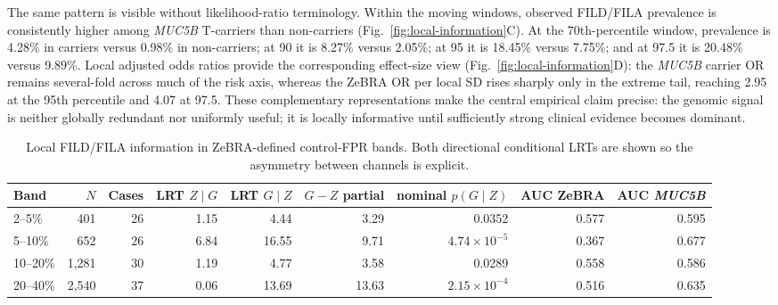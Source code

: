 {The same pattern is visible without likelihood-ratio terminology. Within the moving windows, observed FILD/FILA prevalence is consistently higher among \textit{MUC5B} T-carriers than non-carriers (Fig.~\ref{fig:local-information}C). At the 70th-percentile window, prevalence is 4.28\% in carriers versus 0.98\% in non-carriers; at 90 it is 8.27\% versus 2.05\%; at 95 it is 18.45\% versus 7.75\%; and at 97.5 it is 20.48\% versus 9.89\%. Local adjusted odds ratios provide the corresponding effect-size view (Fig.~\ref{fig:local-information}D): the \textit{MUC5B} carrier OR remains several-fold across much of the risk axis, whereas the ZeBRA OR per local SD rises sharply only in the extreme tail, reaching 2.95 at the 95th percentile and 4.07 at 97.5. These complementary representations make the central empirical claim precise: the genomic signal is neither globally redundant nor uniformly useful; it is locally informative until sufficiently strong clinical evidence becomes dominant.

\figLocalInformation

\begin{table}[!t]
\caption{Local FILD/FILA information in ZeBRA-defined control-FPR bands. Both directional conditional LRTs are shown so the asymmetry between channels is explicit.}
\label{tab:local-info}\centering\scriptsize
\begin{tabular}{lrrrrrrrr}
\toprule
Band & $N$ & Cases & LRT $Z\mid G$ & LRT $G\mid Z$ & $G{-}Z$ partial & nominal $p(G\mid Z)$ & AUC ZeBRA & AUC \textit{MUC5B}\\
\midrule
2--5\% & 401 & 26 & 1.15 & 4.44 & 3.29 & 0.0352 & 0.577 & 0.595\\
5--10\% & 652 & 26 & 6.84 & 16.55 & 9.71 & $4.74\times10^{-5}$ & 0.367 & 0.677\\
10--20\% & 1,281 & 30 & 1.19 & 4.77 & 3.58 & 0.0289 & 0.558 & 0.586\\
20--40\% & 2,540 & 37 & 0.06 & 13.69 & 13.63 & $2.15\times10^{-4}$ & 0.516 & 0.635\\
\bottomrule
\end{tabular}
\end{table}

}
